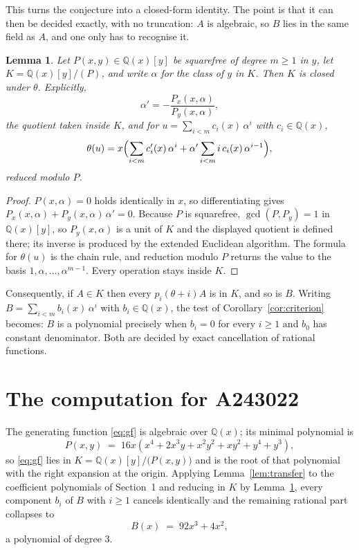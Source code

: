 \documentclass[11pt,a4paper]{article}
\theoremstyle{plain}
\newtheorem{lemma}[theorem]{Lemma}
\theoremstyle{definition}
\begin{document}
This turns the conjecture into a closed-form identity. The point is that it can then be
decided exactly, with no truncation: $A$ is algebraic, so $B$ lies in the same field as
$A$, and one only has to recognise it.

\begin{lemma}\label{lem:field}
Let $P(x,y)\in\mathbb{Q}(x)[y]$ be squarefree of degree $m\ge1$ in $y$, let
$K=\mathbb{Q}(x)[y]/(P)$, and write $\alpha$ for the class of $y$ in $K$. Then $K$ is
closed under $\theta$. Explicitly,
\[
\alpha'=-\frac{P_{x}(x,\alpha)}{P_{y}(x,\alpha)},
\]
the quotient taken inside $K$, and for $u=\sum_{i<m}c_{i}(x)\,\alpha^{i}$ with
$c_{i}\in\mathbb{Q}(x)$,
\[
\theta(u)=x\Bigl(\sum_{i<m}c_{i}'(x)\,\alpha^{i}
 +\alpha'\sum_{i<m}i\,c_{i}(x)\,\alpha^{i-1}\Bigr),
\]
reduced modulo $P$.
\end{lemma}

\begin{proof}
$P(x,\alpha)=0$ holds identically in $x$, so differentiating gives
$P_{x}(x,\alpha)+P_{y}(x,\alpha)\,\alpha'=0$. Because $P$ is squarefree,
$\gcd(P,P_{y})=1$ in $\mathbb{Q}(x)[y]$, so $P_{y}(x,\alpha)$ is a unit of $K$ and the
displayed quotient is defined there; its inverse is produced by the extended Euclidean
algorithm. The formula for $\theta(u)$ is the chain rule, and reduction modulo $P$ returns
the value to the basis $1,\alpha,\dots,\alpha^{m-1}$. Every operation stays inside $K$.
\end{proof}

Consequently, if $A\in K$ then every $p_{i}(\theta+i)A$ is in $K$, and so is $B$. Writing
$B=\sum_{i<m}b_{i}(x)\,\alpha^{i}$ with $b_{i}\in\mathbb{Q}(x)$, the test of
Corollary~\ref{cor:criterion} becomes: $B$ is a polynomial precisely when $b_{i}=0$ for
every $i\ge1$ and $b_{0}$ has constant denominator. Both are decided by exact
cancellation of rational functions.

\section{The computation for A243022}

The generating function \eqref{eq:gf} is algebraic over $\mathbb{Q}(x)$;
its minimal polynomial is
\[
P(x,y) \;=\; 16 x \left(x^{4} + 2 x^{3} y + x^{2} y^{2} + x y^{2} + y^{4} + y^{3}\right) ,
\]
so \eqref{eq:gf} lies in $K=\mathbb{Q}(x)[y]/\bigl(P(x,y)\bigr)$ and is the root of that polynomial with the right
expansion at the origin. Applying Lemma~\ref{lem:transfer} to the coefficient polynomials
of Section~1 and reducing in $K$ by Lemma~\ref{lem:field}, every component $b_{i}$ of $B$
with $i\ge1$ cancels identically and the remaining rational part collapses to
\[
B(x)\;=\;92 x^{3} + 4 x^{2} ,
\]
a polynomial of degree $3$.
\end{document}
